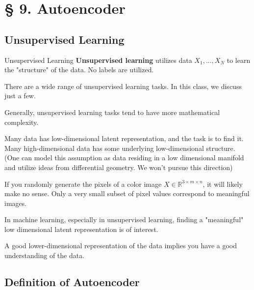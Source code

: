 \section{§ 9. Autoencoder}

\subsection{Unsupervised Learning}

\begin{frame}[allowframebreaks]

\begin{mydefinitionblock}{9.1}{Unsupervised Learning}
    \textbf{Unsupervised learning} utilizes data $X_{1}, \ldots, X_{N}$ to learn the "structure" of the data. No labels are utilized.

    There are a wide range of unsupervised learning tasks. In this class, we discuss just a few.

    Generally, unsupervised learning tasks tend to have more mathematical complexity.
\end{mydefinitionblock}

\end{frame}

\begin{frame}[allowframebreaks]

\begin{myconceptblock}{9.2}{Many data has low-dimensional latent representation, and the task is to find it.}
    Many high-dimensional data has some underlying low-dimensional structure.
    (One can model this assumption as data residing in a low dimensional manifold and utilize ideas from differential geometry. We won’t pursue this direction)

    If you randomly generate the pixels of a color image $X \in \mathbb{R}^{3 \times m \times n}$, it will likely make no sense. Only a very small subset of pixel values correspond to meaningful images.

    In machine learning, especially in unsupervised learning, finding a "meaningful" low dimensional latent representation is of interest.

    A good lower-dimensional representation of the data implies you have a good understanding of the data.
\end{myconceptblock}

\end{frame}

\subsection{Definition of Autoencoder}

